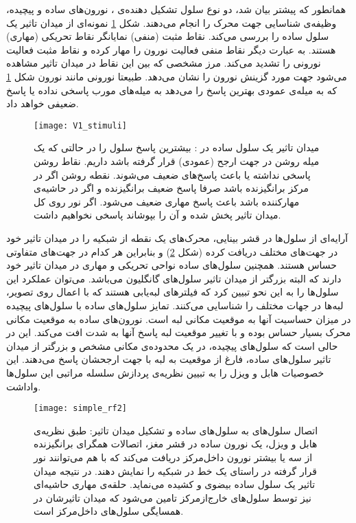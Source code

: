 همانطور که پیشتر بیان شد، دو نوع سلول تشکیل دهنده‌ی ، نورون‌های ساده و پیچیده، وظیفه‌ی شناسایی جهت محرک را انجام می‌دهند. شکل \ref{fig:V1_stimuli} نمونه‌ای از میدان تاثیر یک سلول ساده را بررسی می‌کند. نقاط مثبت (منفی) نمایانگر نقاط تحریکی (مهاری) هستند. به عبارت دیگر نقاط منفی فعالیت نورون را مهار کرده و نقاط مثبت فعالیت نورونی را تشدید می‌کند. مرز مشخصی که بین این نقاط در میدان تاثیر مشاهده می‌شود جهت مورد گزینش نورون را نشان می‌دهد. طبیعتا نورونی مانند نورون شکل \ref{fig:V1_stimuli} که به میله‌ی عمودی بهترین پاسخ را می‌دهد به میله‌های مورب پاسخی نداده یا پاسخ ضعیفی خواهد داد. 

\begin{figure}
\centering
{\footnotesize
\texttt{[image: V1\_stimuli]}
\caption[میدان تاثیر یک سلول ساده در ]{میدان تاثیر یک سلول ساده در : بیشترین پاسخ سلول را در حالتی که یک میله روشن در جهت ارجح (عمودی) قرار گرفته باشد داریم. نقاط روشن پاسخی نداشته یا باعث پاسخ‌های ضعیف می‌شوند. نقطه روشن اگر در مرکز برانگیزنده باشد صرفا پاسخ ضعیف برانگیزنده و اگر در حاشیه‌ی مهارکننده باشد باعث پاسخ مهاری ضعیف می‌شود. اگر نور روی کل میدان تاثیر پخش شده و آن را بپوشاند پاسخی نخواهیم داشت.\cite{kandel2000principles}}
\label{fig:V1_stimuli}
}
\end{figure}

آرایه‌ای از سلول‌ها در قشر بینایی، محرک‌های یک نقطه از شبکیه را در میدان تاثیر خود در جهت‌های مختلف دریافت کرده (شکل \ref{fig:simple_rf2}) و بنابراین هر کدام در جهت‌های متفاوتی حساس هستند. همچنین سلول‌های ساده نواحی تحریکی و مهاری در میدان تاثیر خود دارند که البته بزرگتر از میدان تاثیر سلول‌های گانگلیون می‌باشد. می‌توان عملکرد این سلول‌ها را به این نحو تبیین کرد که فیلترهای لبه‌یابی هستند که با اعمال روی تصویر، لبه‌ها در جهات مختلف را شناسایی می‌کنند. تمایز سلول‌های ساده با سلول‌های پیچیده در میزان حساسیت آنها به موقعیت مکانی لبه است. نورون‌های ساده به موقعیت مکانی محرک بسیار حساس بوده و با تغییر موقعیت لبه پاسخ آنها به شدت افت می‌کند. این در حالی است که سلول‌های پیچیده، در یک محدوده‌ی مکانی مشخص و بزرگتر از میدان تاثیر سلول‌های ساده، فارغ از موقعیت به لبه با جهت ارجحشان پاسخ می‌دهند. این خصوصیات هابل و ویزل را به تبیین نظریه‌ی پردازش سلسله مراتبی این سلول‌ها واداشت\cite{TJP19621601106,hubel1968receptive}.

\begin{figure}
\centering
{\footnotesize
\texttt{[image: simple\_rf2]}
\caption[اتصال سلول‌های  به سلول‌های ساده و تشکیل میدان تاثیر]{اتصال سلول‌های  به سلول‌های ساده و تشکیل میدان تاثیر: طبق نظریه‌ی هابل و ویزل، یک نورون ساده در قشر مغز، اتصالات همگرای برانگیزنده از سه یا بیشتر نورون داخل‌مرکز دریافت می‌کند که با هم می‌توانند نور قرار گرفته در راستای یک خط در شبکیه را نمایش دهند. در نتیجه میدان تاثیر یک سلول ساده بیضوی و کشیده می‌نماید. حلقه‌ی مهاری حاشیه‌ای نیز توسط سلول‌های خارج‌از‌مرکز تامین می‌شود که میدان تاثیرشان در همسایگی سلول‌های داخل‌مرکز است.\cite{kandel2000principles}}
\label{fig:simple_rf2}
}
\end{figure}

